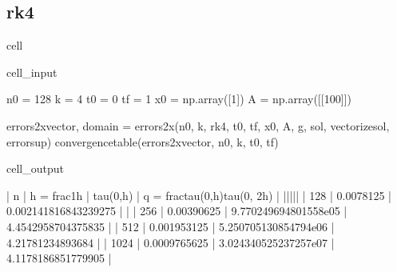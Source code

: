 \documentclass[letterpaper,10pt,english]{jupyterBook}
\begin{document}
\subsection{rk4}
\label{\detokenize{appendix:rk4}}
\begin{sphinxuseclass}{cell}\begin{sphinxVerbatimInput}

\begin{sphinxuseclass}{cell_input}
\begin{sphinxVerbatim}[commandchars=\\\{\}]
n0 = 128
k = 4
t0 = 0
tf = 1
x0 = np.array([1])
A = np.array([[100]])

errors\PYGZus{}2x\PYGZus{}vector, domain = errors\PYGZus{}2x(n0, k, rk4, t0, tf, x0, A, g, sol, vectorize\PYGZus{}sol, error\PYGZus{}sup)
convergence\PYGZus{}table(errors\PYGZus{}2x\PYGZus{}vector, n0, k, t0, tf)
\end{sphinxVerbatim}

\end{sphinxuseclass}\end{sphinxVerbatimInput}
\begin{sphinxVerbatimOutput}

\begin{sphinxuseclass}{cell_output}
\begin{sphinxVerbatim}[commandchars=\\\{\}]
| n | h = \PYGZdl{}\PYGZbs{}frac\PYGZob{}1\PYGZcb{}\PYGZob{}h\PYGZcb{}\PYGZdl{} | \PYGZdl{}\PYGZbs{}tau(0,h)\PYGZdl{} | q = \PYGZdl{}\PYGZbs{}frac\PYGZob{}tau(0,h)\PYGZcb{}\PYGZob{}tau(0, 2h)\PYGZcb{}\PYGZdl{} |
|\PYGZhy{}\PYGZhy{}\PYGZhy{}|\PYGZhy{}\PYGZhy{}\PYGZhy{}\PYGZhy{}\PYGZhy{}\PYGZhy{}\PYGZhy{}\PYGZhy{}\PYGZhy{}\PYGZhy{}\PYGZhy{}\PYGZhy{}\PYGZhy{}\PYGZhy{}\PYGZhy{}\PYGZhy{}\PYGZhy{}|\PYGZhy{}\PYGZhy{}\PYGZhy{}\PYGZhy{}\PYGZhy{}\PYGZhy{}\PYGZhy{}\PYGZhy{}\PYGZhy{}\PYGZhy{}\PYGZhy{}|\PYGZhy{}\PYGZhy{}\PYGZhy{}\PYGZhy{}\PYGZhy{}\PYGZhy{}\PYGZhy{}\PYGZhy{}\PYGZhy{}\PYGZhy{}\PYGZhy{}\PYGZhy{}\PYGZhy{}\PYGZhy{}\PYGZhy{}\PYGZhy{}\PYGZhy{}\PYGZhy{}\PYGZhy{}\PYGZhy{}\PYGZhy{}\PYGZhy{}\PYGZhy{}\PYGZhy{}\PYGZhy{}\PYGZhy{}\PYGZhy{}\PYGZhy{}\PYGZhy{}\PYGZhy{}\PYGZhy{}\PYGZhy{}\PYGZhy{}|
 | 128 | 0.0078125 | 0.002141816843239275 | \PYGZhy{} | 
 | 256 | 0.00390625 | 9.770249694801558e\PYGZhy{}05 | 4.4542958704375835 | 
 | 512 | 0.001953125 | 5.250705130854794e\PYGZhy{}06 | 4.21781234893684 | 
 | 1024 | 0.0009765625 | 3.024340525237257e\PYGZhy{}07 | 4.1178186851779905 | 
\end{sphinxVerbatim}

\end{sphinxuseclass}\end{sphinxVerbatimOutput}

\end{sphinxuseclass}
\end{document}
